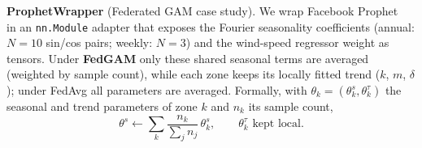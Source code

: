 \textbf{ProphetWrapper} (Federated GAM case study). We wrap Facebook Prophet~\cite{taylor2018prophet} in an \texttt{nn.Module} adapter that exposes the Fourier seasonality coefficients (annual: $N{=}10$ sin/cos pairs; weekly: $N{=}3$) and the wind-speed regressor weight as tensors. Under \textbf{FedGAM} only these shared seasonal terms are averaged (weighted by sample count), while each zone keeps its locally fitted trend ($k$, $m$, $\delta$); under FedAvg all parameters are averaged. Formally, with $\theta_k = (\theta_k^{s}, \theta_k^{\tau})$ the seasonal and trend parameters of zone $k$ and $n_k$ its sample count,
\begin{equation}
\theta^{s} \leftarrow \sum_k \frac{n_k}{\sum_j n_j}\,\theta_k^{s}, \qquad \theta_k^{\tau} \text{ kept local}.
\label{eq:fedgam}
\end{equation}
